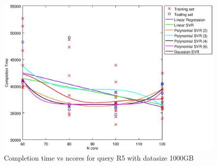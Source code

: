 
\begin {figure}[hbtp]
\centering
\includegraphics[width=\textwidth]{output/R5_1000_ONLY_1_LINEAR_NCORE/plot_R5_1000.eps}
\caption{Completion time vs ncores for query R5 with datasize 1000GB}
\label{fig:only_1_linear_R5_1000}
\end {figure}

